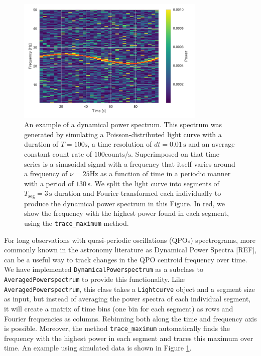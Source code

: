 \documentclass[12pt]{emulateapj}
\newcommand{\lightcurve}{\texttt{Lightcurve}\xspace}
\begin{document}
\begin{figure}[htbp]
\begin{center}
\includegraphics[width=9cm]{dyn_spec.pdf}
\caption{An example of a dynamical power spectrum. This spectrum was generated by simulating a Poisson-distributed light curve with a duration of $T=100 \mathrm{s}$, a time resolution of $dt = 0.01\,\mathrm{s}$ and an average constant count rate of $100\mathrm{counts/s}$. Superimposed on that time series is a sinusoidal signal with a frequency that itself varies around a frequency of $\nu = 25\mathrm{Hz}$ as a function of time in a periodic manner with a period of $130\,\mathrm{s}$. We split the light curve into segments of $T_\mathrm{seg} = 3\,\mathrm{s}$ duration and Fourier-transformed each individually to produce the dynamical power spectrum in this Figure. In red, we show the frequency with the highest power found in each segment, using the \texttt{trace_maximum} method.}
\label{fig:dynspec}
\end{center}
\end{figure}

For long observations with quasi-periodic oscillations (QPOs) spectrograms, more commonly known in the astronomy literature as Dynamical Power Spectra [REF], can be a useful way to track changes in the QPO centroid frequency over time. We have implemented \texttt{DynamicalPowerspectrum} as a subclass to \texttt{AveragedPowerspectrum} to provide this functionality. Like \texttt{AveragedPowerspectrum}, this class takes a \lightcurve object and a segment size as input, but instead of averaging the power spectra of each individual segment, it will create a matrix of time bins (one bin for each segment) as rows and Fourier frequencies as columns. Rebinning both along the time and frequency axis is possible. Moreover, the method \texttt{trace_maximum} automatically finds the frequency with the highest 
power in each segment and traces this maximum over time. An example using simulated data is shown in Figure \ref{fig:dynspec}.
\end{document}

